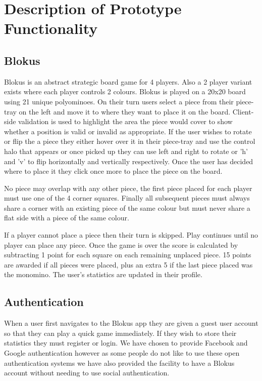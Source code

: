 
\section{Description of Prototype Functionality}

\subsection{Blokus}
Blokus is an abstract strategic board game for 4 players. Also a 2 player variant exists where each player controls 2 colours. Blokus is played on a 20x20 board using 21 unique polyominoes. On their turn users select a piece from their piece-tray on the left and move it to where they want to place it on the board. Client-side validation is used to highlight the area the piece would cover to show whether a position is valid or invalid as appropriate. If the user wishes to rotate or flip the a piece they either hover over it in their piece-tray and use the control halo that appears or once picked up they can use left and right to rotate or 'h' and 'v' to flip horizontally and vertically respectively. Once the user has decided where to place it they click once more to place the piece on the board.

No piece may overlap with any other piece, the first piece placed for each player must use one of the 4 corner squares. Finally all subsequent pieces must always share a corner with an existing piece of the same colour but must never share a flat side with a piece of the same colour.

If a player cannot place a piece then their turn is skipped. Play continues until no player can place any piece. Once the game is over the score is calculated by subtracting 1 point for each square on each remaining unplaced piece. 15 points are awarded if all pieces were placed, plus an extra 5 if the last piece placed was the monomino. The user's statistics are updated in their profile.

\subsection{Authentication}
When a user first navigates to the Blokus app they are given a guest user account so that they can play a quick game immediately. If they wish to store their statistics they must register or login. We have chosen to provide Facebook and Google authentication however as some people do not like to use these open authentication systems we have also provided the facility to have a Blokus account without needing to use social authentication.

